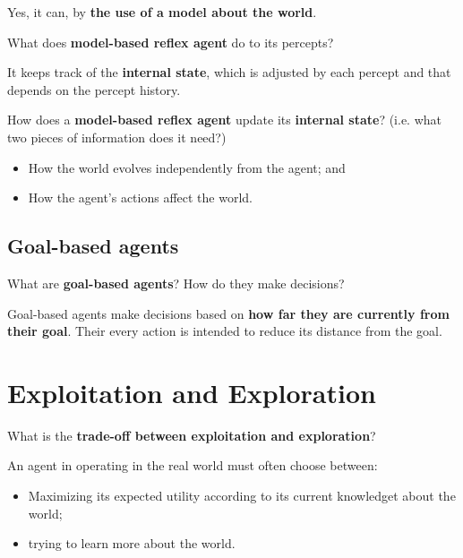 Yes, it can, by \textbf{the use of a model about the world}.

\begin{cstqsn*}
What does \textbf{model-based reflex agent} do to its percepts?
\end{cstqsn*}

It keeps track of the \textbf{internal state}, which is adjusted by each
percept and that depends on the percept history.

\begin{cstqsn*}
How does a \textbf{model-based reflex agent} update its \textbf{internal
state}? (i.e. what two pieces of information does it need?)
\end{cstqsn*}

\begin{itemize}
  \item How the world evolves independently from the agent; and 
  \item How the agent's actions affect the world.
\end{itemize}

\subsection{Goal-based agents}

\begin{cstqsn*}
What are \textbf{goal-based agents}? How do they make decisions?
\end{cstqsn*}

Goal-based agents make decisions based on \textbf{how far they are currently
from their goal}. Their every action is intended to reduce its distance from
the goal.

\section{Exploitation and Exploration}

\begin{cstqsn*}
What is the \textbf{trade-off between exploitation and exploration}?
\end{cstqsn*}

An agent in operating in the real world must often choose between: 

\begin{itemize}
  \item Maximizing its expected utility according to its current knowledget
    about the world;
  \item trying to learn more about the world.
\end{itemize}
